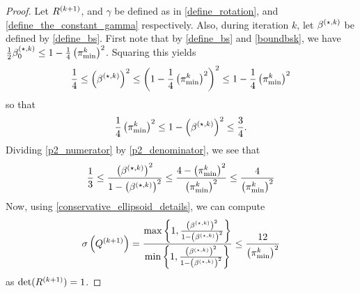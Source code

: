 \begin{proof}
Let ${R^{(k+1)}}$, and $\gamma$ be defined as in \cref{define_rotation}, and \cref{define_the_constant_gamma} respectively.
Also, during iteration $k$, let ${\beta^{(\star, k)}}$ be defined by \cref{define_bs}.
First note that by \cref{define_bs} and \cref{boundbsk}, we have
$\frac 1 2 {\beta_0^{(\star, k)}} \le 1 - \frac 1 4 \left({\pi^k_{\textrm{min}}}\right)^2$.
Squaring this yields
\begin{align}
\frac {1} 4 \le \left({\beta^{(\star, k)}}\right)^2 \le \left(1 - \frac 1 4 \left({\pi^k_{\textrm{min}}}\right)^2\right)^2 \le 1 - \frac 1 4 \left({\pi^k_{\textrm{min}}}\right)^2 \label{p2_numerator}
\end{align}
so that
\begin{align}
\frac 1 4  \left({\pi^k_{\textrm{min}}}\right)^2 \le 1 - \left({\beta^{(\star, k)}}\right)^2 \le \frac 3 4. \label{p2_denominator}
\end{align}
Dividing \cref{p2_numerator} by \cref{p2_denominator}, we see that
\begin{align*}
\frac 1 3
\le \frac{\left({\beta^{(\star, k)}}\right)^2}{1 - \left({\beta^{(\star, k)}}\right)^2}
\le \frac {4 - \left({\pi^k_{\textrm{min}}}\right)^2}{\left({\pi^k_{\textrm{min}}}\right)^2} \le \frac {4}{\left({\pi^k_{\textrm{min}}}\right)^2}
\end{align*}
Now, using \cref{conservative_ellipsoid_details}, we can compute 
\begin{align*}
{\sigma} \left({Q^{(k+1)}}\right) 
= \frac{\max\left\{1, \frac{\left({\beta^{(\star, k)}}\right)^2}{1 - \left({\beta^{(\star, k)}}\right)^2}\right\}}{\min\left\{1, \frac{\left({\beta^{(\star, k)}}\right)^2}{1 - \left({\beta^{(\star, k)}}\right)^2}\right\}} 
\le \frac {12}{\left({\pi^k_{\textrm{min}}}\right)^2}
\end{align*}
as $\det({R^{(k+1)}}) = 1$.
\end{proof}




\begin{lemma}
\label[lemma]{cone_subset_cone}
Given $u, v \in \Rn$, and $\gamma \in (0, 1]$, $\beta \in [0, \gamma)$ that satisfy $\|u\| = \|v\|= 1$, $u^Tv = \gamma$, define
\begin{align*}
B = \{x\in\Rn | {v}^Tx \ge \beta\|x\|\}, \quad
S = \left\{x\in\Rn \bigg| u^Tx \ge \left(\beta\gamma + \sqrt{(1 - \beta^2)\left(1 - \gamma^2\right)}\right)\|x\| \right\}. 
\end{align*}
Then, $S \subseteq B$.
\end{lemma}

